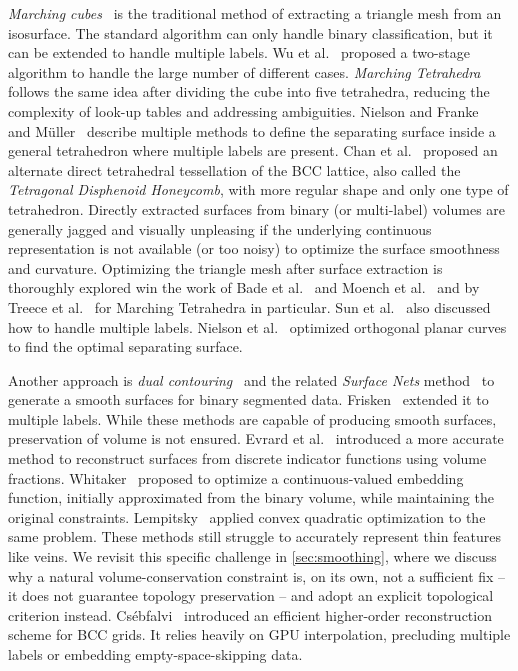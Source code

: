 \documentclass[journal]{vgtc}                     %
\begin{document}
\emph{Marching cubes}~\cite{lorensen1987marching} is the traditional method of extracting a triangle mesh from an isosurface. The standard algorithm can only handle binary classification, but it can be extended to handle multiple labels. Wu et al.~\cite{wu2003multiple} proposed a two-stage algorithm to handle the large number of different cases.
\emph{Marching Tetrahedra}~\cite{gueziec2002exploiting} follows the same idea after dividing the cube into five tetrahedra, reducing the complexity of look-up tables and addressing ambiguities.
Nielson and Franke~\cite{nielson1997computing} and M{\"u}ller~\cite{planning1995boundary} describe multiple methods to define the separating surface inside a general tetrahedron where multiple labels are present.
Chan et al.~\cite{CHAN199883} proposed an alternate direct tetrahedral tessellation of the BCC lattice, also called the \emph{Tetragonal Disphenoid Honeycomb}, with more regular shape and only one type of tetrahedron.
Directly extracted surfaces from binary (or multi-label) volumes are generally jagged and visually unpleasing if the underlying continuous representation is not available (or too noisy) to optimize the surface smoothness and curvature.
Optimizing the triangle mesh after surface extraction is thoroughly explored win the work of Bade et al.~\cite{bade2007reducing} and Moench et al.~\cite{moench2010staircase,moench2011context} and by Treece et al.~\cite{treece1999regularised} for Marching Tetrahedra in particular. Sun et al.~\cite{sun2024multi} also discussed how to handle multiple labels.
Nielson et al.~\cite{nielson2003shrouds} optimized orthogonal planar curves to find the optimal separating surface.

Another approach is \emph{dual contouring}~\cite{ju2002dual} and the related \emph{Surface Nets} method~\cite{gibson1998using,gibson1998constrained} to generate a smooth surfaces for binary segmented data. Frisken~\cite{frisken2022surfacenets} extended it to multiple labels. While these methods are capable of producing smooth surfaces, preservation of volume is not ensured. Evrard et al.~\cite{evrard2018surface} introduced a more accurate method to reconstruct surfaces from discrete indicator functions using volume fractions.
Whitaker~\cite{whitaker2000reducing} proposed to optimize a continuous-valued embedding function, initially approximated from the binary volume, while maintaining the original constraints.
Lempitsky~\cite{lempitsky2010surface} applied convex quadratic optimization to the same problem.
These methods still struggle to accurately represent thin features like veins. We revisit this specific challenge in \cref{sec:smoothing}, where we discuss why a natural volume-conservation constraint is, on its own, not a sufficient fix -- it does not guarantee topology preservation -- and adopt an explicit topological criterion instead.
Cs\'ebfalvi~\cite{csebfalvi2013cosine} introduced an efficient higher-order reconstruction scheme for BCC grids. It relies heavily on GPU interpolation, precluding multiple labels or embedding empty-space-skipping data.
\end{document}
